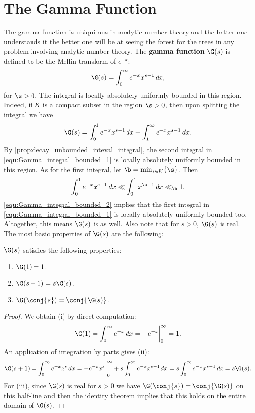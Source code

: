     \section{The Gamma Function}
      The gamma function is ubiquitous in analytic number theory and the better one understands it the better one will be at seeing the forest for the trees in any problem involving analytic number theory. The \textbf{gamma function} $\G(s)$ is defined to be the Mellin transform of $e^{-x}$:
      \[
        \G(s) = \int_{0}^{\infty}e^{-x}x^{s-1}\,dx,
      \]
      for $\s > 0$. The integral is locally absolutely uniformly bounded in this region. Indeed, if $K$ is a compact subset in the region $\s > 0$, then upon splitting the integral we have
      \begin{equation}\label{equ:Gamma_integral_bounded_1}
        \G(s) = \int_{0}^{1}e^{-x}x^{s-1}\,dx+\int_{1}^{\infty}e^{-x}x^{s-1}\,dx.
      \end{equation}
      By \cref{prop:decay_unbounded_inteval_integral}, the second integral in \cref{equ:Gamma_integral_bounded_1} is locally absolutely uniformly bounded in this region. As for the first integral, let $\b = \min_{s \in K}\{\s\}$. Then
      \begin{equation}\label{equ:Gamma_integral_bounded_2}
        \int_{0}^{1}e^{-x}x^{s-1}\,dx \ll \int_{0}^{1}x^{\s-1}\,dx \ll_{\b} 1.
      \end{equation}
      \cref{equ:Gamma_integral_bounded_2} implies that the first integral in \cref{equ:Gamma_integral_bounded_1} is locally absolutely uniformly bounded too. Altogether, this means $\G(s)$ is as well. Also note that for $s >0$, $\G(s)$ is real. The most basic properties of $\G(s)$ are the following:

      \begin{proposition}\label{prop:Factorial_properties_of_gamma_function}
        $\G(s)$ satisfies the following properties:
        \begin{enumerate}[label=(\roman*)]
          \item $\G(1) = 1$.
          \item $\G(s+1) = s\G(s)$.
          \item $\G(\conj{s}) = \conj{\G(s)}$.
        \end{enumerate}
      \end{proposition}
      \begin{proof}
        We obtain (i) by direct computation:
        \[
          \G(1) = \int_{0}^{\infty}e^{-x}\,dx = -e^{-x}\bigg|_{0}^{\infty} = 1.
        \]
        An application of integration by parts gives (ii):
        \[
          \G(s+1) = \int_{0}^{\infty}e^{-x}x^{s}\,dx = -e^{-x}x^{s}\bigg|_{0}^{\infty}+s\int_{0}^{\infty}e^{-x}x^{s-1}\,dx = s\int_{0}^{\infty}e^{-x}x^{s-1}\,dx = s\G(s).
        \]
        For (iii), since $\G(s)$ is real for $s >0$ we have $\G(\conj{s}) = \conj{\G(s)}$ on this half-line and then the identity theorem implies that this holds on the entire domain of $\G(s)$.
      \end{proof}

